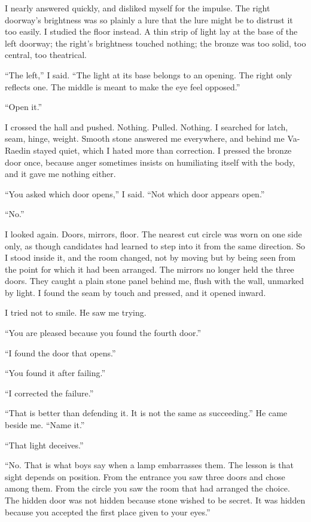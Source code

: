 I nearly answered quickly, and disliked myself for the impulse.
The right doorway's brightness was so plainly a lure that the lure might be to distrust it too easily.
I studied the floor instead.
A thin strip of light lay at the base of the left doorway; the right's brightness touched nothing; the bronze was too solid, too central, too theatrical.\par

``The left,'' I said. ``The light at its base belongs to an opening. The right only reflects one. The middle is meant to make the eye feel opposed.''\par
``Open it.''\par

I crossed the hall and pushed.
Nothing.
Pulled.
Nothing.
I searched for latch, seam, hinge, weight.
Smooth stone answered me everywhere, and behind me Va-Raedin stayed quiet, which I hated more than correction.
I pressed the bronze door once, because anger sometimes insists on humiliating itself with the body, and it gave me nothing either.\par

``You asked which door opens,'' I said. ``Not which door appears open.''\par

``No.''\par

I looked again. Doors, mirrors, floor. 
The nearest cut circle was worn on one side only, as though candidates had learned to step into it from the same direction. 
So I stood inside it, and the room changed, not by moving but by being seen from the point for which it had been arranged. 
The mirrors no longer held the three doors. 
They caught a plain stone panel behind me, flush with the wall, unmarked by light. 
I found the seam by touch and pressed, and it opened inward.\par

I tried not to smile. He saw me trying.\par

``You are pleased because you found the fourth door.''\par
``I found the door that opens.''\par
``You found it after failing.''\par
``I corrected the failure.''\par
``That is better than defending it. It is not the same as succeeding.'' He came beside me. ``Name it.''\par
``That light deceives.''\par
``No. That is what boys say when a lamp embarrasses them. 
The lesson is that sight depends on position. 
From the entrance you saw three doors and chose among them. 
From the circle you saw the room that had arranged the choice. 
The hidden door was not hidden because stone wished to be secret. 
It was hidden because you accepted the first place given to your eyes.''\par

